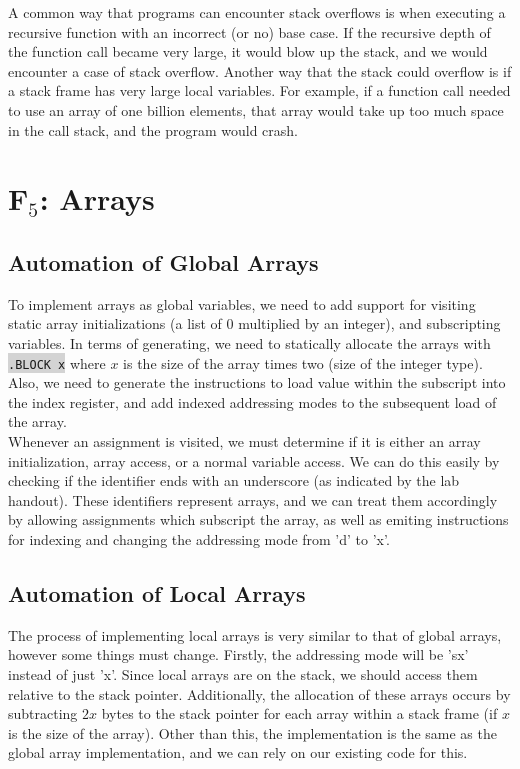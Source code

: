 \documentclass[12pt]{article}
\newcommand{\code}[1]{\colorbox{LightGray}{\texttt{#1}}}
\begin{document}
A common way that programs can encounter stack overflows is when executing a recursive function with an incorrect (or no) base case. If the recursive depth of the function call became very large, it would blow up the stack, and we would encounter a case of stack overflow. Another way that the stack could overflow is if a stack frame has very large local variables. For example, if a function call needed to use an array of one billion elements, that array would take up too much space in the call stack, and the program would crash.

\section*{F$_5$: Arrays}
\subsection*{Automation of Global Arrays}
To implement arrays as global variables, we need to add support for visiting static array initializations (a list of 0 multiplied by an integer), and subscripting variables. In terms of generating, we need to statically allocate the arrays with \code{.BLOCK x} where $x$ is the size of the array times two (size of the integer type). Also, we need to generate the instructions to load value within the subscript into the index register, and add indexed addressing modes to the subsequent load of the array. \\

Whenever an assignment is visited, we must determine if it is either an array initialization, array access, or a normal variable access. We can do this easily by checking if the identifier ends with an underscore (as indicated by the lab handout). These identifiers represent arrays, and we can treat them accordingly by allowing assignments which subscript the array, as well as emiting instructions for indexing and changing the addressing mode from 'd' to 'x'.

\subsection*{Automation of Local Arrays}
The process of implementing local arrays is very similar to that of global arrays, however some things must change. Firstly, the addressing mode will be 'sx' instead of just 'x'. Since local arrays are on the stack, we should access them relative to the stack pointer. Additionally, the allocation of these arrays occurs by subtracting $2x$ bytes to the stack pointer for each array within a stack frame (if $x$ is the size of the array). Other than this, the implementation is the same as the global array implementation, and we can rely on our existing code for this.
\end{document}

